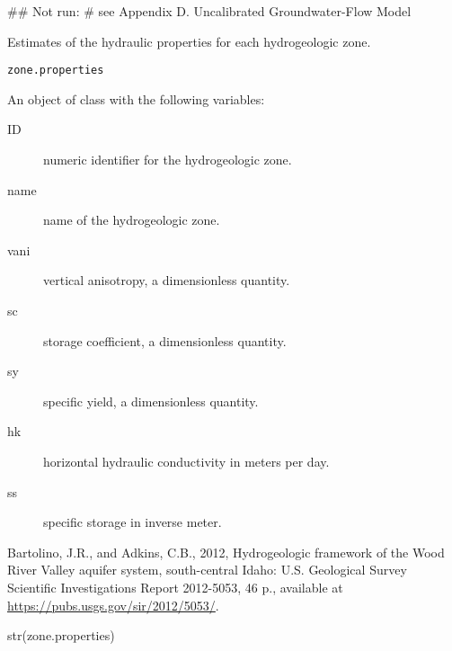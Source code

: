 \documentclass[a4paper]{book}
\begin{document}
%
\begin{Examples}
\begin{ExampleCode}
## Not run: # see Appendix D. Uncalibrated Groundwater-Flow Model

\end{ExampleCode}
\end{Examples}
%
\begin{Description}\relax
Estimates of the hydraulic properties for each hydrogeologic zone.
\end{Description}
%
\begin{Usage}
\begin{verbatim}
zone.properties
\end{verbatim}
\end{Usage}
%
\begin{Format}
An object of  class with the following variables:
\begin{description}

\item[ID] numeric identifier for the hydrogeologic zone.
\item[name] name of the hydrogeologic zone.
\item[vani] vertical anisotropy, a dimensionless quantity.
\item[sc] storage coefficient, a dimensionless quantity.
\item[sy] specific yield, a dimensionless quantity.
\item[hk] horizontal hydraulic conductivity in meters per day.
\item[ss] specific storage in inverse meter.

\end{description}
\end{Format}
%
\begin{References}\relax
Bartolino, J.R., and Adkins, C.B., 2012, Hydrogeologic framework of the
Wood River Valley aquifer system, south-central Idaho:
U.S. Geological Survey Scientific Investigations Report 2012-5053, 46 p.,
available at \url{https://pubs.usgs.gov/sir/2012/5053/}.
\end{References}
%
\begin{Examples}
\begin{ExampleCode}
str(zone.properties)

\end{ExampleCode}
\end{Examples}
\printindex{}
\end{document}
